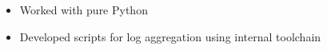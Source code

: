 \begin{itemize}
	\item Worked with pure Python
    \item Developed scripts for log aggregation using internal toolchain
\end{itemize}
